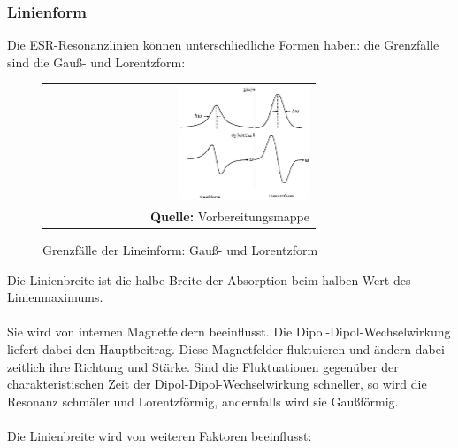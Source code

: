 \documentclass[a4paper,titlepage]{scrartcl}
\numberwithin{equation}{section}
\begin{document}
\subsubsection{Linienform}
Die ESR-Resonanzlinien können unterschliedliche Formen haben: die Grenzfälle sind die Gauß- und Lorentzform:
\begin{figure}[H]
	\centering
	\begin{tabular}{@{}r@{}}
		\includegraphics[width=0.5\textwidth]{images/linienform.png}\\
		\footnotesize\sffamily\textbf{Quelle:} Vorbereitungsmappe \cite{mappe}
	\end{tabular}
	\caption{Grenzfälle der Lineinform: Gauß- und Lorentzform}
    \label{fig:linienform}
\end{figure}
Die Linienbreite ist die halbe Breite der Absorption beim halben Wert des Linienmaximums.\\ \\
Sie wird von internen Magnetfeldern beeinflusst. Die Dipol-Dipol-Wechselwirkung liefert dabei den Hauptbeitrag. Diese Magnetfelder fluktuieren und ändern dabei zeitlich ihre Richtung und Stärke. Sind die Fluktuationen gegenüber der charakteristischen Zeit der Dipol-Dipol-Wechselwirkung schneller, so wird die Resonanz schmäler und Lorentzförmig, andernfalls wird sie Gaußförmig.\\ \\
Die Linienbreite wird von weiteren Faktoren beeinflusst:
\end{document}
